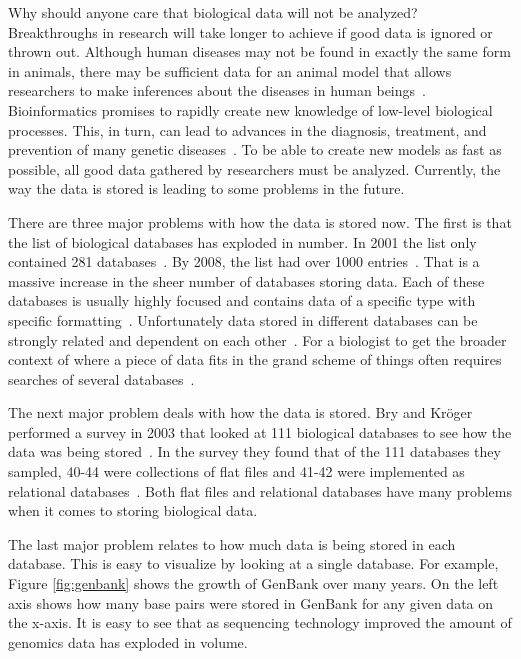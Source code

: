 \documentclass[12pt]{ucthesis}
\begin{document}
Why should anyone care that biological data will not be analyzed? Breakthroughs in research will take longer to achieve if good data is ignored or thrown out. Although human diseases may not be found in exactly the same form in animals, there may be sufficient data for an animal model that allows researchers to make inferences about the diseases in human beings~\cite{bioinformatics_factsheet}. Bioinformatics promises to rapidly create new knowledge of low-level biological processes. This, in turn, can lead to advances in the diagnosis, treatment, and prevention of many genetic diseases~\cite{bioinformatics_factsheet}. To be able to create new models as fast as possible, all good data gathered by researchers must be analyzed. Currently, the way the data is stored is leading to some problems in the future.


There are three major problems with how the data is stored now.
The first is that the list of biological databases has exploded in number. In 2001 the list only contained 281 databases~\cite{galperin_molecular_2008}. By 2008, the list had over 1000 entries~\cite{galperin_molecular_2008}. That is a massive increase in the sheer number of databases storing data. Each of these databases is usually highly focused and contains  data of a specific type with specific formatting~\cite{biozon}. Unfortunately data stored in different databases can be strongly related and dependent on each other~\cite{biozon}. For a biologist to get the broader context of where a piece of data fits in the grand scheme of things  often requires searches of several databases~\cite{biozon}.

 The next major problem deals with how the data is stored. Bry and Kr\"{o}ger performed a survey in 2003 that looked at 111 biological databases to see how the data was being stored~\cite{bry_computational_2003}. In the survey they found that of the 111 databases they sampled, 40-44 were collections of flat files and 41-42 were implemented as relational databases~\cite{bry_computational_2003}. Both flat files and relational databases have many problems when it comes to storing biological data. 
 
 The last major problem relates to how much data is being stored in each database. This is easy to visualize by looking at a single database. For example, Figure \ref{fig:genbank} shows the growth of GenBank over many years. On the left axis shows how many base pairs were stored in GenBank for any given data on the x-axis. It is easy to see that as sequencing technology improved the amount of genomics data has exploded in volume. 
\end{document}
